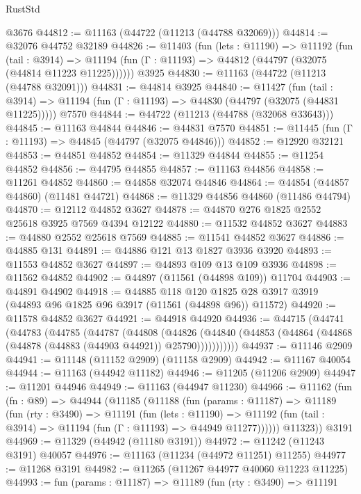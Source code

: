 \begin{lexlean}{RustStd}
\begin{coremodule}
    @3676
@44812 := @11163 (@44722 (@11213 (@44788 @32069)))
@44814 := @32076 @44752 @32189
@44826 := @11403
    (fun (lets : @11190) =>
    @11192
      (fun (tail : @3914) =>
      @11194 (fun (Γ : @11193) => @44812 (@44797 (@32075 (@44814 @11223 @11225))))))
    @3925
@44830 := @11163 (@44722 (@11213 (@44788 @32091)))
@44831 := @44814 @3925
@44840 := @11427
    (fun (tail : @3914) => @11194 (fun (Γ : @11193) => @44830 (@44797 (@32075 (@44831 @11225)))))
    @7570
@44844 := @44722 (@11213 (@44788 (@32068 @33643)))
@44845 := @11163 @44844
@44846 := @44831 @7570
@44851 := @11445 (fun (Γ : @11193) => @44845 (@44797 (@32075 @44846)))
@44852 := @12920 @32121
@44853 := @44851 @44852
@44854 := @11329 @44844
@44855 := @11254 @44852
@44856 := @44795 @44855
@44857 := @11163 @44856
@44858 := @11261 @44852
@44860 := @44858 @32074 @44846
@44864 := @44854 (@44857 @44860) (@11481 @44721)
@44868 := @11329 @44856 @44860 (@11486 @44794)
@44870 := @12112 @44852 @3627
@44878 := @44870 @276 @1825 @2552 @25618 @3925 @7569 @4394 @12122
@44880 := @11532 @44852 @3627
@44883 := @44880 @2552 @25618 @7569
@44885 := @11541 @44852 @3627
@44886 := @44885 @131
@44891 := @44886 @121 @13 @1827 @3936 @3920
@44893 := @11553 @44852 @3627
@44897 := @44893 @109 @13 @109 @3936
@44898 := @11562 @44852
@44902 := @44897 (@11561 (@44898 @109)) @11704
@44903 := @44891 @44902
@44918 := @44885
    @118
    @120
    @1825
    @28
    @3917
    @3919
    (@44893 @96 @1825 @96 @3917 (@11561 (@44898 @96)) @11572)
@44920 := @11578 @44852 @3627
@44921 := @44918 @44920
@44936 := @44715
    (@44741
      (@44783
        (@44785
          (@44787
            (@44808
              (@44826
                (@44840 (@44853 (@44864 (@44868 (@44878 (@44883 (@44903 @44921)) @25790)))))))))))
@44937 := @11146 @2909
@44941 := @11148 (@11152 @2909) (@11158 @2909)
@44942 := @11167 @40054
@44944 := @11163 (@44942 @11182)
@44946 := @11205 (@11206 @2909)
@44947 := @11201 @44946
@44949 := @11163 (@44947 @11230)
@44966 := @11162
    (fun (fn : @89) =>
    @44944
      (@11185
        (@11188
          (fun (params : @11187) =>
          @11189
            (fun (rty : @3490) =>
            @11191
              (fun (lets : @11190) =>
              @11192 (fun (tail : @3914) => @11194 (fun (Γ : @11193) => @44949 @11277))))))
        @11323))
    @3191
@44969 := @11329 (@44942 (@11180 @3191))
@44972 := @11242 (@11243 @3191) @40057
@44976 := @11163 (@11234 (@44972 @11251) @11255)
@44977 := @11268 @3191
@44982 := @11265 (@11267 @44977 @40060 @11223 @11225)
@44993 := fun (params : @11187) =>
  @11189
    (fun (rty : @3490) =>
    @11191

\end{coremodule}
\end{lexlean}
